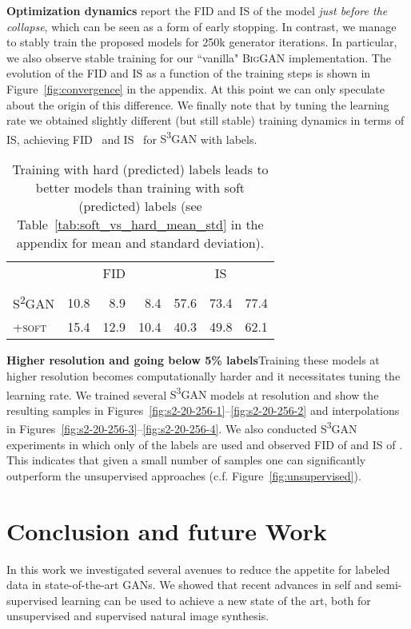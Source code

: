 \documentclass{article}
\newcommand{\tranSS}{\textsc{S\textsuperscript{2}GAN}}
\newcommand{\tranSSS}{\textsc{S\textsuperscript{3}GAN}}
\newcommand{\biggan}{\textsc{BigGAN}}
\begin{document}
\textbf{Optimization dynamics}\quad \citet{brock2018large} report the FID and IS of the model \emph{just before the collapse}, which can be seen as a form of early stopping. In contrast, we manage to stably train the proposed models for 250k generator iterations. In particular, we also observe stable training for our ``vanilla" \biggan{} implementation. The evolution of the FID and IS as a function of the training steps is shown in Figure~\ref{fig:convergence} in the appendix. At this point we can only speculate about the origin of this difference. We finally note that by tuning the learning rate we obtained slightly different (but still stable) training dynamics in terms of IS, achieving FID~ and IS~ for \tranSSS{} with  labels.


\begin{table}[t]
\caption{Training with hard (predicted) labels leads to better models than training with soft (predicted) labels (see Table~\ref{tab:soft_vs_hard_mean_std} in the appendix for mean and standard deviation).\vspace{0.2cm}}
\centering
\setlength\tabcolsep{4.5pt}
\begin{tabular}{lrrrrrr}
\toprule
&\multicolumn{3}{c}{\textsc{FID}} & \multicolumn{3}{c}{\textsc{IS}}\\\cmidrule(lr){2-4}\cmidrule(lr){5-7}
&         &   &    &    &   &    \\
\midrule
\tranSS{}       &           10.8 &   8.9 &   8.4 &  57.6 &  73.4 &  77.4 \\
\textsc{+soft}	&           15.4 &  12.9 &  10.4 &  40.3 &  49.8 &  62.1 \\
\bottomrule
\end{tabular} \label{tab:soft_vs_hard}
\end{table}


\textbf{Higher resolution and going below 5\% labels}\quad Training these models at higher resolution becomes computationally harder and it necessitates tuning the learning rate. We trained several \tranSSS{} models at  resolution and show the resulting samples in Figures~\ref{fig:s2-20-256-1}--\ref{fig:s2-20-256-2} and interpolations in Figures~\ref{fig:s2-20-256-3}--\ref{fig:s2-20-256-4}.
We also conducted \tranSSS{} experiments in which only  of the labels are used and observed FID of  and IS of . This indicates that given a small number of samples one can significantly outperform the unsupervised approaches (c.f. Figure~\ref{fig:unsupervised}).


\section{Conclusion and future Work}
In this work we investigated several avenues to reduce the appetite for labeled data in state-of-the-art GANs. We showed that recent advances in self and semi-supervised learning can be used to achieve a new state of the art, both for unsupervised and supervised natural image synthesis.
\end{document}
